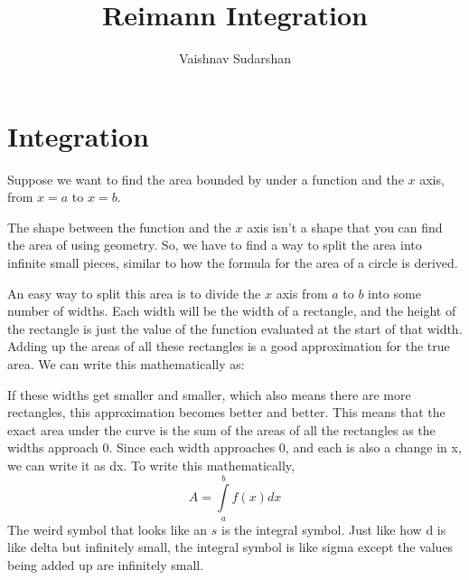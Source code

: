 \documentclass[
]{article}
\title{Reimann Integration}
\author{Vaishnav Sudarshan}
\date{}
\begin{document}
\maketitle

\section{Integration}\label{integration}

Suppose we want to find the area bounded by under a function and the
\(x\) axis, from \(x = a\) to \(x = b\).

The shape between the function and the \(x\) axis isn't a shape that you
can find the area of using geometry. So, we have to find a way to split
the area into infinite small pieces, similar to how the formula for the
area of a circle is derived.

An easy way to split this area is to divide the \(x\) axis from \(a\) to
\(b\) into some number of widths. Each width will be the width of a
rectangle, and the height of the rectangle is just the value of the
function evaluated at the start of that width. Adding up the areas of
all these rectangles is a good approximation for the true area. We can
write this mathematically as:

If these widths get smaller and smaller, which also means there are more
rectangles, this approximation becomes better and better. This means
that the exact area under the curve is the sum of the areas of all the
rectangles as the widths approach 0. Since each width approaches 0, and
each is also a change in x, we can write it as dx. To write this
mathematically, \[
A = \int\limits_{a}^{b} f(x) dx
\] The weird symbol that looks like an \(s\) is the integral symbol.
Just like how d is like delta but infinitely small, the integral symbol
is like sigma except the values being added up are infinitely small.
\end{document}
